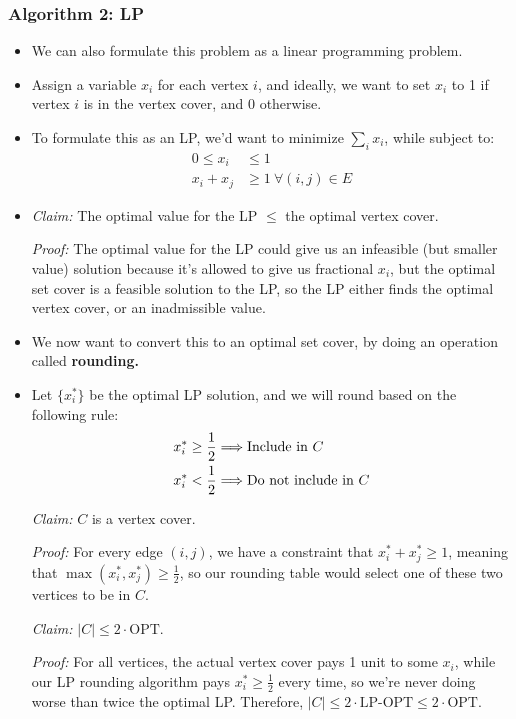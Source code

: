 \subsubsection{Algorithm 2: LP}
\begin{itemize}
	\item We can also formulate this problem as a linear programming problem.
	\item Assign a variable \( x_i \) for each vertex \( i \), and ideally, we want to set \( x_i \) to 1 
		if vertex \( i \) is in the vertex cover, and 0 otherwise. 
	\item To formulate this as an LP, we'd want to minimize \( \sum_i x_i \), while subject to:
		\begin{align*}
			0 \le  x_i &\le  1\\
			x_i + x_j &\ge 1 \ \forall (i, j) \in E
		\end{align*}
	\item \textit{Claim:} The optimal value for the LP \( \le  \) the optimal vertex cover.

		\textit{Proof:} The optimal value for the LP could give us an infeasible (but smaller value) solution 
		because it's allowed to give us fractional \( x_i \), but the optimal set cover is a feasible solution 
		to the LP, so the LP either finds the optimal vertex cover, or an inadmissible value.    

	\item We now want to convert this to an optimal set cover, by doing an operation called \textbf{rounding.}
	\item Let \( \{x_i^*\}  \) be the optimal LP solution, and we will round based on the following rule:
		\begin{align*}
			x_i^* &\ge  \frac{1}{2} \Longrightarrow \text{Include in \( C \)}\\
			x_i^* &< \frac{1}{2} \Longrightarrow \text{Do not include in \( C \)}
		\end{align*}
		
		\textit{Claim:} \( C \) is a vertex cover.

		\textit{Proof:} For every edge \( (i, j) \), we have a constraint that \( x_i^* + x_j^* \ge  1\), meaning
		that \( \max(x_i^*, x_j^*) \ge  \frac{1}{2} \), so our rounding table would select one of these two 
		vertices to be in \( C \). 

		\textit{Claim:} \( |C| \le 2\cdot \text{OPT} \).

		\textit{Proof:} For all vertices, the actual vertex cover pays 1 unit to some \( x_i \), while  our LP 
		rounding algorithm pays \( x_i^* \ge  \frac{1}{2} \) every time, 
		so we're never doing worse than twice the optimal 
		LP. Therefore, \( |C| \le  2 \cdot \text{LP-OPT} \le  2 \cdot \text{OPT} \).
		

\end{itemize}
